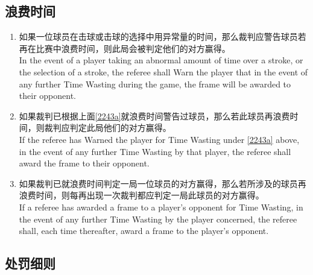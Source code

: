\subsection{浪费时间}\label{2243}

\begin{enumerate}[label=(\alph*)]
    \item \label{2243a}如果一位球员在击球或击球的选择中用异常量的时间，那么裁判应警告球员若再在比赛中浪费时间，则此局会被判定他们的对方赢得。\\
    In the event of a player taking an abnormal amount of time over a stroke, or the selection of a stroke, the referee shall Warn the player that in the event of any further Time Wasting during the game, the frame will be awarded to their opponent.
    \item \label{2243b}如果裁判已根据上面\ref{2243a}就浪费时间警告过球员，那么若此球员再浪费时间，则裁判应判定此局他们的对方赢得。\\
    If the referee has Warned the player for Time Wasting under \ref{2243a} above, in the event of any further Time Wasting by that player, the referee shall award the frame to their opponent.
    \item \label{2243c}如果裁判已就浪费时间判定一局一位球员的对方赢得，那么若所涉及的球员再浪费时间，则每再出现一次裁判都应判定一局此球员的对方赢得。\\
    If a referee has awarded a frame to a player's opponent for Time Wasting, in the event of any further Time Wasting by the player concerned, the referee shall, each time thereafter, award a frame to the player's opponent.
\end{enumerate}

\subsection{处罚细则}

